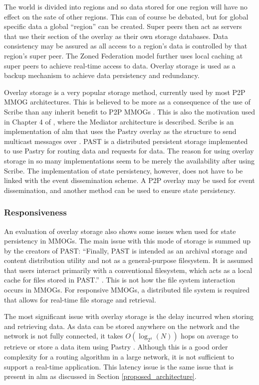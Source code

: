 \documentclass[10pt,a4paper,journal,cspaper,compsoc]{IEEEtran}
\begin{document}
The world is divided into regions and so data stored for one region will have no effect on the sate of other regions. This can of course be debated,
but for global specific data a global ``region'' can be created. Super peers then act as servers that use their section of the overlay as their own
storage databases. Data consistency may be assured as all access to a region's data is controlled by that region's super peer. The Zoned Federation
model further uses local caching at super peers to achieve real-time access to data. Overlay storage is used as a backup mechanism to achieve data
persistency and redundancy.

Overlay storage is a very popular storage method, currently used by most P2P MMOG architectures. This is believed to be more as a consequence of the
use of Scribe than any inherit benefit to P2P MMOGs \cite{past_storage_focus}. This is also the motivation used in Chapter 4 of \cite{Fan_phd}, where
the Mediator architecture is described. Scribe is an implementation of \ac{alm} that uses the Pastry overlay as the structure to send multicast
messages over \cite{scribe}. PAST is a distributed persistent storage implemented to use Pastry for routing data and requests for data. The reason
for using overlay storage in so many implementations seem to be merely the availability after using Scribe. The implementation of state persistency,
however, does not have to be linked with the event dissemination scheme. A P2P overlay may be used for event dissemination, and another method can be
used to ensure state persistency.

\subsubsection{Responsiveness}
An evaluation of overlay storage also shows some issues when used for state persistency in MMOGs. The main issue with this mode of storage is summed
up by the creators of PAST: ``Finally, PAST is intended as an archival storage and content distribution utility and not as a general-purpose
filesystem. It is assumed that users interact primarily with a conventional filesystem, which acts as a local cache for files stored in PAST.''
\cite{storage_and_chaching_PAST}. This is not how the file system interaction occurs in MMOGs. For responsive MMOGs, a distributed file system is
required that allows for real-time file storage and retrieval.

The most significant issue with overlay storage is the delay incurred when storing and retrieving data. As data can be stored anywhere on the network
and the network is not fully connected, it takes $O(\log_{2^4}(N))$ hops on average to retrieve or store a data item using Pastry
\cite{storage_and_chaching_PAST}. Although this is a good order complexity for a routing algorithm in a large network, it is not sufficient to
support a real-time application. This latency issue is the same issue that is present in \ac{alm} as discussed in Section
\ref{proposed_architecture}.
\end{document}
